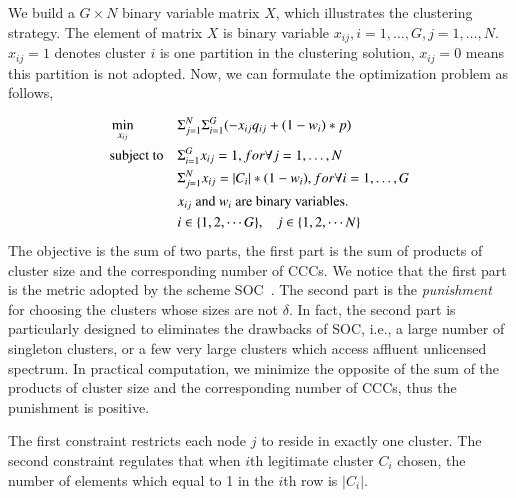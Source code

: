 \documentclass[10pt,journal,compsoc]{IEEEtran}
\theoremstyle{mytheoremstyle}
\theoremstyle{mytheoremstyle}
\theoremstyle{mytheoremstyle}
\newcommand{\ie}{i.e., }
\begin{document}
We build a $G\times N$ binary variable matrix $X$, which illustrates the clustering strategy.
The element of matrix $X$ is binary variable $x_{ij}, i=1, \ldots, G, j=1, \ldots, N$.
$x_{ij}=1$ denotes cluster $i$ is one partition in the clustering solution, $x_{ij}=0$ means this partition is not adopted.
Now, we can formulate the optimization problem as follows,

\begin{equation}
\begin{aligned}
     &\min\limits_{x_{ij}} && \Sigma_{j=1}^N\Sigma_{i=1}^G (-x_{ij}q_{ij} + (1-w_i)*p) \\
     &\text{subject to}   && \Sigma_{i=1}^G x_{ij} = 1, for \forall j=1, \ldots, N \\
   &&& \Sigma_{j=1}^N x_{ij} = |C_i|*(1-w_i), for \forall i=1, \ldots, G \\
   &&& \text{$x_{ij}$ and $w_i$ are binary variables.}\\
   &&& i\in \{1,2, \cdots G\}, \hspace{0.3cm} j\in \{1,2,\cdots N\}
\notag
\end{aligned}
\end{equation}
The objective is the sum of two parts, the first part is the sum of products of cluster size and the corresponding number of CCCs.
We notice that the first part is the metric adopted by the scheme SOC~\cite{Lazos09}.
The second part is the \textit{punishment} for choosing the clusters whose sizes are not $\delta$.
In fact, the second part is particularly designed to eliminates the drawbacks of SOC, \ie a large number of singleton clusters, or a few very large clusters which access affluent unlicensed spectrum.
In practical computation, we minimize the opposite of the sum of the products of cluster size and the corresponding number of CCCs, thus the punishment is positive.

The first constraint restricts each node $j$ to reside in exactly one cluster.
The second constraint regulates that when $i$th legitimate cluster $C_i$ chosen, the number of elements which equal to 1 in the $i$th row is $|C_i|$.
\end{document}

